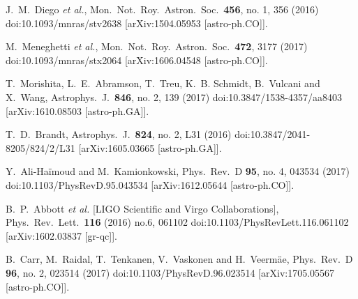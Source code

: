 \documentclass[showpacs,twocolumn,preprintnumbers,amsmath,amssymb,superscriptaddress,nofootinbib]{revtex4}
\begin{document}
\begin{thebibliography}{0}
  J.~M.~Diego {\it et al.},
  Mon.\ Not.\ Roy.\ Astron.\ Soc.\  {\bf 456}, no. 1, 356 (2016)
  doi:10.1093/mnras/stv2638
  [arXiv:1504.05953 [astro-ph.CO]].

  M.~Meneghetti {\it et al.},
  Mon.\ Not.\ Roy.\ Astron.\ Soc.\  {\bf 472}, 3177 (2017)
  doi:10.1093/mnras/stx2064
  [arXiv:1606.04548 [astro-ph.CO]].

  T.~Morishita, L.~E.~Abramson, T.~Treu, K.~B. Schmidt, B.~Vulcani and X.~Wang,
  Astrophys.\ J.\  {\bf 846}, no. 2, 139 (2017)
  doi:10.3847/1538-4357/aa8403
  [arXiv:1610.08503 [astro-ph.GA]].

  T.~D.~Brandt,
  Astrophys.\ J.\  {\bf 824}, no. 2, L31 (2016)
  doi:10.3847/2041-8205/824/2/L31
  [arXiv:1605.03665 [astro-ph.GA]].

  Y.~Ali-Haïmoud and M.~Kamionkowski,
  Phys.\ Rev.\ D {\bf 95}, no. 4, 043534 (2017)
  doi:10.1103/PhysRevD.95.043534
  [arXiv:1612.05644 [astro-ph.CO]].

  B.~P.~Abbott {\it et al.} [LIGO Scientific and Virgo Collaborations],
  Phys.\ Rev.\ Lett.\  {\bf 116} (2016) no.6,  061102
  doi:10.1103/PhysRevLett.116.061102
  [arXiv:1602.03837 [gr-qc]].

  B.~Carr, M.~Raidal, T.~Tenkanen, V.~Vaskonen and H.~Veermäe,
  Phys.\ Rev.\ D {\bf 96}, no. 2, 023514 (2017)
  doi:10.1103/PhysRevD.96.023514
  [arXiv:1705.05567 [astro-ph.CO]].

\end{thebibliography}
\end{document}
